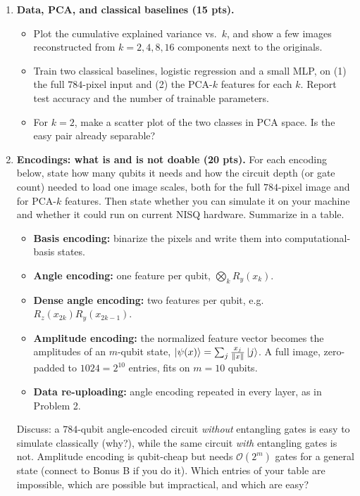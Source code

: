 \documentclass[11pt]{article}
\begin{document}
\begin{enumerate}[label=(\alph*)]
\item \textbf{Data, PCA, and classical baselines (15 pts).}
\begin{itemize}
\item Plot the cumulative explained variance vs.\ $k$, and show a few images reconstructed from $k=2,4,8,16$ components next to the originals.
\item Train two classical baselines, logistic regression and a small MLP, on (1) the full $784$-pixel input and (2) the PCA-$k$ features for each $k$. Report test accuracy and the number of trainable parameters.
\item For $k=2$, make a scatter plot of the two classes in PCA space. Is the easy pair already separable?
\end{itemize}

\item \textbf{Encodings: what is and is not doable (20 pts).}
For each encoding below, state how many qubits it needs and how the circuit depth (or gate count) needed to load one image scales, both for the full $784$-pixel image and for PCA-$k$ features. Then state whether you can simulate it on your machine and whether it could run on current NISQ hardware. Summarize in a table.
\begin{itemize}
\item \textbf{Basis encoding:} binarize the pixels and write them into computational-basis states.
\item \textbf{Angle encoding:} one feature per qubit, $\bigotimes_k R_y(x_k)$.
\item \textbf{Dense angle encoding:} two features per qubit, e.g.\ $R_z(x_{2k})R_y(x_{2k-1})$.
\item \textbf{Amplitude encoding:} the normalized feature vector becomes the amplitudes of an $m$-qubit state, $\ket{\psi(x)}=\sum_j \frac{x_j}{\|x\|}\ket{j}$. A full image, zero-padded to $1024=2^{10}$ entries, fits on $m=10$ qubits.
\item \textbf{Data re-uploading:} angle encoding repeated in every layer, as in Problem 2.
\end{itemize}
Discuss: a $784$-qubit angle-encoded circuit \emph{without} entangling gates is easy to simulate classically (why?), while the same circuit \emph{with} entangling gates is not. Amplitude encoding is qubit-cheap but needs $\mathcal{O}(2^m)$ gates for a general state (connect to Bonus B if you do it). Which entries of your table are impossible, which are possible but impractical, and which are easy?


\end{enumerate}
\end{document}
